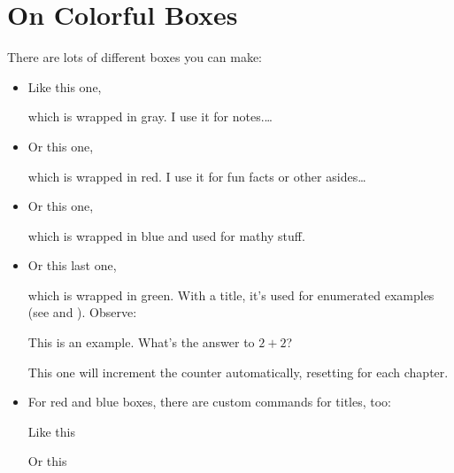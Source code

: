 \documentclass[letterpaper,12pt,notitlepage,twoside]{report}
\begin{document}
\section{On Colorful Boxes}
There are lots of different boxes you can make:
%
\begin{itemize}
  \item Like this one,
    \begin{notebox}
      which is wrapped in gray. I use it for notes.\ldots
    \end{notebox}

  \item Or this one,
    \begin{funfact}
      which is wrapped in red. I use it for fun facts or other asides\ldots
    \end{funfact}

  \item Or this one,
    \begin{mathaside}
      which is wrapped in blue and used for mathy stuff.
    \end{mathaside}

  \item Or this last one,
    \begin{example}
      which is wrapped in green. With a title, it's used for enumerated examples
      (see  and ).
      Observe:
    \end{example}

    \begin{example}[frametitle=\extitle{Test}]
      This is an example. What's the answer to $2+2$?
    \end{example}

    \begin{example}[frametitle=\extitle{Test Again}]
      This one will increment the counter automatically, resetting for each
      chapter.
    \end{example}


  \item For red and blue boxes, there are custom commands for titles, too:
    \begin{mathaside}[frametitle=\mathtitle{One Title}]
      Like this
    \end{mathaside}
    \begin{mathaside}[frametitle=\mathtitlep{Two Titles}{A Subtitle}]
      Or this
    \end{mathaside}
\end{itemize}
\end{document}
